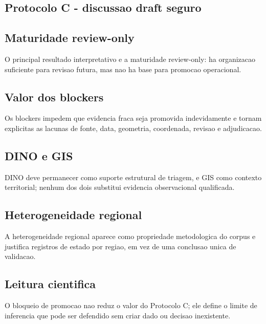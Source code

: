 
\subsection{Protocolo C - discussao draft seguro}

\subsection{Maturidade review-only}
O principal resultado interpretativo e a maturidade review-only: ha organizacao suficiente para revisao futura, mas nao ha base para promocao operacional.

\subsection{Valor dos blockers}
Os blockers impedem que evidencia fraca seja promovida indevidamente e tornam explicitas as lacunas de fonte, data, geometria, coordenada, revisao e adjudicacao.

\subsection{DINO e GIS}
DINO deve permanecer como suporte estrutural de triagem, e GIS como contexto territorial; nenhum dos dois substitui evidencia observacional qualificada.

\subsection{Heterogeneidade regional}
A heterogeneidade regional aparece como propriedade metodologica do corpus e justifica registros de estado por regiao, em vez de uma conclusao unica de validacao.

\subsection{Leitura cientifica}
O bloqueio de promocao nao reduz o valor do Protocolo C; ele define o limite de inferencia que pode ser defendido sem criar dado ou decisao inexistente.
